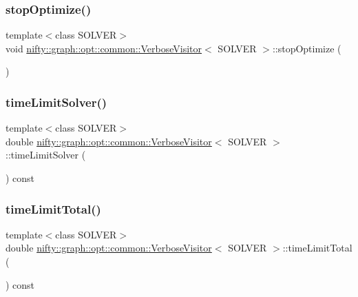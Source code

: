 \subsubsection{\texorpdfstring{stop\+Optimize()}{stopOptimize()}}
{\footnotesize\ttfamily template$<$class S\+O\+L\+V\+ER$>$ \\
void \hyperlink{classnifty_1_1graph_1_1opt_1_1common_1_1VerboseVisitor}{nifty\+::graph\+::opt\+::common\+::\+Verbose\+Visitor}$<$ S\+O\+L\+V\+ER $>$\+::stop\+Optimize (\begin{DoxyParamCaption}{ }\end{DoxyParamCaption})\hspace{0.3cm}{\ttfamily [inline]}}

\mbox{\label{classnifty_1_1graph_1_1opt_1_1common_1_1VerboseVisitor_a84b59607c8922f5be67b21e08adc9b5d}} 
\subsubsection{\texorpdfstring{time\+Limit\+Solver()}{timeLimitSolver()}}
{\footnotesize\ttfamily template$<$class S\+O\+L\+V\+ER$>$ \\
double \hyperlink{classnifty_1_1graph_1_1opt_1_1common_1_1VerboseVisitor}{nifty\+::graph\+::opt\+::common\+::\+Verbose\+Visitor}$<$ S\+O\+L\+V\+ER $>$\+::time\+Limit\+Solver (\begin{DoxyParamCaption}{ }\end{DoxyParamCaption}) const\hspace{0.3cm}{\ttfamily [inline]}}

\mbox{\label{classnifty_1_1graph_1_1opt_1_1common_1_1VerboseVisitor_a60babdee8b9daa8f48f43dc6bab8c5c0}} 
\subsubsection{\texorpdfstring{time\+Limit\+Total()}{timeLimitTotal()}}
{\footnotesize\ttfamily template$<$class S\+O\+L\+V\+ER$>$ \\
double \hyperlink{classnifty_1_1graph_1_1opt_1_1common_1_1VerboseVisitor}{nifty\+::graph\+::opt\+::common\+::\+Verbose\+Visitor}$<$ S\+O\+L\+V\+ER $>$\+::time\+Limit\+Total (\begin{DoxyParamCaption}{ }\end{DoxyParamCaption}) const\hspace{0.3cm}{\ttfamily [inline]}}

